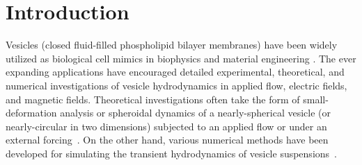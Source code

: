 \documentclass[prf,superscriptaddress,showpacs]{revtex4-1}
\begin{document}
\maketitle



\section{Introduction}
Vesicles (closed fluid-filled phospholipid bilayer membranes) have been
widely utilized as biological cell mimics in biophysics and material
engineering \cite{sackmann1996}.  The ever expanding applications have
encouraged detailed experimental, theoretical, and numerical
investigations of vesicle hydrodynamics in applied flow, electric
fields, and magnetic fields.  Theoretical investigations often take the
form of small-deformation analysis or spheroidal dynamics of a
nearly-spherical vesicle (or nearly-circular in two dimensions)
subjected to an applied flow or under an external
forcing~\cite{Barthes-BieselRallison1981_JFM, Misbah2006_PRL,
Vlahovska2007_PRE, Finken2008_EPL, ZhangZahnTanLin2013_PoF,
Nganguia2013_PRE}.  On the other hand, various numerical methods have
been developed for simulating the transient hydrodynamics of vesicle
suspensions~\cite{BagchiJohoson2005_JBE, Biben2005_EJP,
Veerapaneni2009_JCP, SeolHuKimLai2016_JCP}.  
\end{document}
